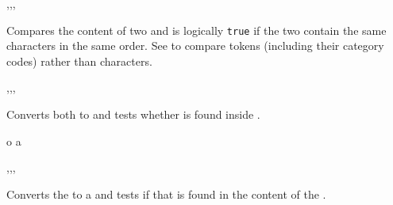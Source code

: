 \documentclass[oneside]{book}
\begin{document}
\begin{function}{\strVarIfEq,\strVarIfEqT,\strVarIfEqF,\strVarIfEqTF}
\begin{syntax}
  
   
   
    
\end{syntax}
Compares the content of two  and
is logically \texttt{true} if the two contain the same characters
in the same order.  See  to compare tokens
(including their category codes) rather than characters.
\begin{demohigh}
\strSet {}
\strSet {}
\strSet {}
\strVarIfEqTF \lTmpaStr {} {}
\strVarIfEqTF \lTmpaStr {} {}
\end{demohigh}
\end{function}

\begin{function}{\strIfIn,\strIfInT,\strIfInF,\strIfInTF}
\begin{syntax}
  
   
   
    
\end{syntax}
Converts both  to  and
tests whether  is found inside .
\begin{demohigh}
 {o} {}{}
 {a} {}{}
\end{demohigh}
\end{function}

\begin{function}{\strVarIfIn,\strVarIfInT,\strVarIfInF,\strVarIfInTF}
\begin{syntax}
  
   
   
    
\end{syntax}
Converts the  to a  and
tests if that  is found in the content of the .
\begin{demohigh}
\strSet {}
\strVarIfInTF {} {}{}
\strVarIfInTF {} {}{}
\end{demohigh}
\end{function}
\end{document}
